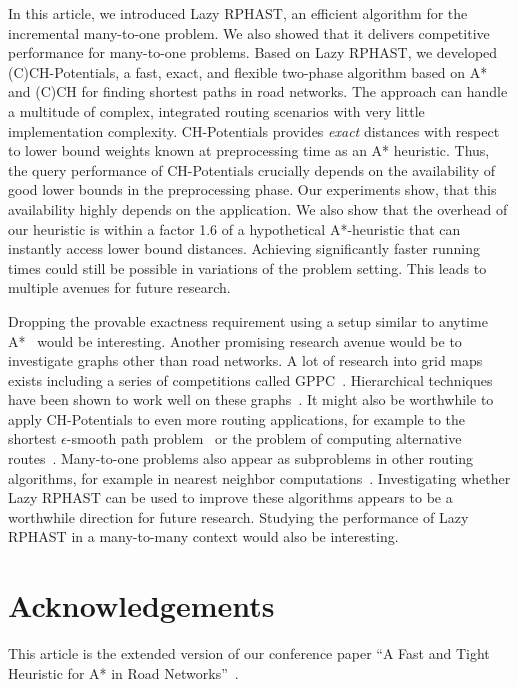 \documentclass[manuscript,review]{acmart}
\begin{document}
In this article, we introduced Lazy RPHAST, an efficient algorithm for the incremental many-to-one problem.
We also showed that it delivers competitive performance for many-to-one problems.
Based on Lazy RPHAST, we developed (C)CH-Potentials, a fast, exact, and flexible two-phase algorithm based on A* and (C)CH for finding shortest paths in road networks.
The approach can handle a multitude of complex, integrated routing scenarios with very little implementation complexity.
CH-Potentials provides \emph{exact} distances with respect to lower bound weights known at preprocessing time as an A* heuristic.
Thus, the query performance of CH-Potentials crucially depends on the availability of good lower bounds in the preprocessing phase.
Our experiments show, that this availability highly depends on the application.
We also show that the overhead of our heuristic is within a factor 1.6 of a hypothetical A*-heuristic that can instantly access lower bound distances.
Achieving significantly faster running times could still be possible in variations of the problem setting.
This leads to multiple avenues for future research.

Dropping the provable exactness requirement using a setup similar to anytime A*~\cite{DBLP:conf/aaai/ZhouH02,DBLP:conf/nips/LikhachevGT03} would be interesting.
Another promising research avenue would be to investigate graphs other than road networks.
A lot of research into grid maps exists including a series of competitions called GPPC~\cite{DBLP:conf/socs/SturtevantTTUKS15}.
Hierarchical techniques have been shown to work well on these graphs~\cite{DBLP:conf/aaai/UrasK14}.
It might also be worthwhile to apply CH-Potentials to even more routing applications, for example to the shortest $\epsilon$-smooth path problem~\cite{dss-tarrn-18} or the problem of computing alternative routes~\cite{adgw-arrn-13,bdgs-argrn-11,kobitzsch2015alternative}.
Many-to-one problems also appear as subproblems in other routing algorithms, for example in nearest neighbor computations~\cite{buchhold_et_al:LIPIcs.SEA.2021.18}.
Investigating whether Lazy RPHAST can be used to improve these algorithms appears to be a worthwhile direction for future research.
Studying the performance of Lazy RPHAST in a many-to-many context would also be interesting.

\section*{Acknowledgements}
This article is the extended version of our conference paper ``A Fast and Tight Heuristic for A* in Road Networks''~\cite{strasser_et_al:LIPIcs.SEA.2021.6}.
\end{document}
